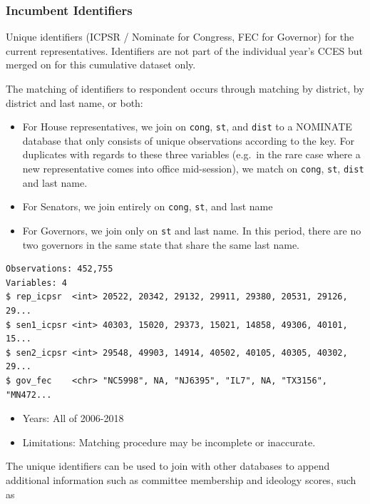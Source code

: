 \documentclass[10pt,article,oneside]{memoir}
\theoremstyle{definition}
\begin{document}
\hypertarget{incumbent-identifiers}{%
\subsubsection{Incumbent Identifiers}\label{incumbent-identifiers}}

Unique identifiers (ICPSR / Nominate for Congress, FEC for Governor) for
the current representatives. Identifiers are not part of the individual
year's CCES but merged on for this cumulative dataset only.

The matching of identifiers to respondent occurs through matching by
district, by district and last name, or both:

\begin{itemize}
\tightlist
\item
  For House representatives, we join on \texttt{cong}, \texttt{st}, and
  \texttt{dist} to a NOMINATE database that only consists of unique
  observations according to the key. For duplicates with regards to
  these three variables (e.g.~in the rare case where a new
  representative comes into office mid-session), we match on
  \texttt{cong}, \texttt{st}, \texttt{dist} and last name.
\item
  For Senators, we join entirely on \texttt{cong}, \texttt{st}, and last
  name
\item
  For Governors, we join only on \texttt{st} and last name. In this
  period, there are no two governors in the same state that share the
  same last name.
\end{itemize}

\begin{verbatim}
Observations: 452,755
Variables: 4
$ rep_icpsr  <int> 20522, 20342, 29132, 29911, 29380, 20531, 29126, 29...
$ sen1_icpsr <int> 40303, 15020, 29373, 15021, 14858, 49306, 40101, 15...
$ sen2_icpsr <int> 29548, 49903, 14914, 40502, 40105, 40305, 40302, 29...
$ gov_fec    <chr> "NC5998", NA, "NJ6395", "IL7", NA, "TX3156", "MN472...
\end{verbatim}

\begin{itemize}
\tightlist
\item
  Years: All of 2006-2018
\item
  Limitations: Matching procedure may be incomplete or inaccurate.
\end{itemize}

The unique identifiers can be used to join with other databases to
append additional information such as committee membership and ideology
scores, such as
\end{document}
